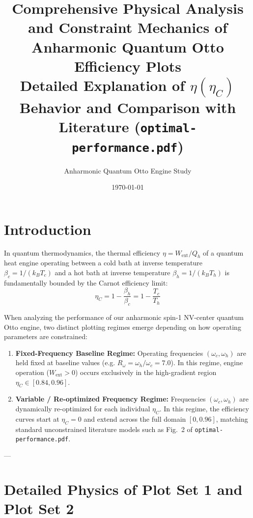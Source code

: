 \documentclass[11pt,a4paper]{article}
\title{\textbf{Comprehensive Physical Analysis and Constraint Mechanics of Anharmonic Quantum Otto Efficiency Plots}\\
\large Detailed Explanation of $\eta(\eta_C)$ Behavior and Comparison with Literature (\texttt{optimal-performance.pdf})}
\author{Anharmonic Quantum Otto Engine Study}
\date{\today}
\begin{document}
\maketitle

\tableofcontents
\newpage

\section{Introduction}
In quantum thermodynamics, the thermal efficiency $\eta = W_{\mathrm{ext}} / Q_h$ of a quantum heat engine operating between a cold bath at inverse temperature $\beta_c = 1/(k_B T_c)$ and a hot bath at inverse temperature $\beta_h = 1/(k_B T_h)$ is fundamentally bounded by the Carnot efficiency limit:
\begin{equation}
\eta_C = 1 - \frac{\beta_h}{\beta_c} = 1 - \frac{T_c}{T_h}
\end{equation}

When analyzing the performance of our anharmonic spin-1 NV-center quantum Otto engine, two distinct plotting regimes emerge depending on how operating parameters are constrained:
\begin{enumerate}
    \item \textbf{Fixed-Frequency Baseline Regime:} Operating frequencies $(\omega_c, \omega_h)$ are held fixed at baseline values (e.g. $R_\omega = \omega_h / \omega_c = 7.0$). In this regime, engine operation ($W_{\mathrm{ext}} > 0$) occurs exclusively in the high-gradient region $\eta_C \in [0.84, 0.96]$.
    \item \textbf{Variable / Re-optimized Frequency Regime:} Frequencies $(\omega_c, \omega_h)$ are dynamically re-optimized for each individual $\eta_C$. In this regime, the efficiency curves start at $\eta_C = 0$ and extend across the full domain $[0, 0.96]$, matching standard unconstrained literature models such as Fig.~2 of \texttt{optimal-performance.pdf}.
\end{enumerate}

---

\section{Detailed Physics of Plot Set 1 and Plot Set 2}
\end{document}
